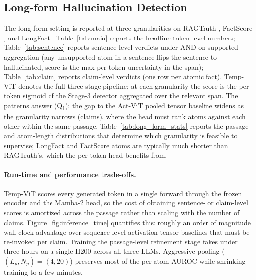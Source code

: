 \subsection{Long-form Hallucination Detection}
\label{sec:longform}

The long-form setting is reported at three granularities on RAGTruth
\citep{niu2024ragtruth}, FactScore \citep{min2023}, and LongFact
\citep{wei2024}. Table~\ref{tab:main} reports the headline
token-level numbers; Table~\ref{tab:sentence} reports
sentence-level verdicts under AND-on-supported aggregation
(any unsupported atom in a sentence flips the sentence to
hallucinated, score is the max per-token uncertainty in the span);
Table~\ref{tab:claim} reports claim-level verdicts (one row per
atomic fact). Temp-ViT denotes the full three-stage pipeline; at each
granularity the score is the per-token sigmoid of the Stage-3
detector aggregated over the relevant span. The patterns answer
(Q\textsubscript{1}): the gap to the Act-ViT pooled tensor baseline
widens as the granularity narrows (claims), where the head must rank
atoms against each other within the same passage.
Table~\ref{tab:long_form_stats} reports the passage- and atom-length
distributions that determine which granularity is feasible to
supervise; LongFact and FactScore atoms are typically much shorter
than RAGTruth's, which the per-token head benefits from.

\paragraph{Run-time and performance trade-offs.} Temp-ViT scores
every generated token in a single forward through the frozen encoder
and the Mamba-2 head, so the cost of obtaining sentence- or
claim-level scores is amortized across the passage rather than
scaling with the number of claims. Figure~\ref{fig:inference_time}
quantifies this: roughly an order of magnitude wall-clock advantage
over sequence-level activation-tensor baselines that must be
re-invoked per claim. Training the passage-level refinement stage
takes under three hours on a single H200 across all three LLMs.
Aggressive pooling ($(L_p, N_p) = (4, 20)$) preserves most of the
per-atom AUROC while shrinking training to a few minutes.

